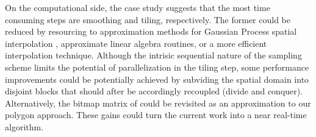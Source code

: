  On the computational side, the
case study suggests that the most time consuming steps are smoothing
and tiling, respectively. The former could be reduced by resourcing to
approximation methods for Gaussian Process spatial interpolation
\citep{Shi2007,Cressie2008,Katzfuss2011,Nguyen2012,Nguyen2014},
approximate linear algebra routines, or a more efficient interpolation
technique. Although the intrisic sequential nature of the sampling
scheme limits the potential of parallelization in the tiling step,
some performance improvements could be potentially achieved by
subviding the spatial domain into disjoint blocks that should after be
accordingly recoupled (divide and conquer). Alternatively, the bitmap
matrix of \cite{Han1997} could be revisited as an approximation to our
polygon approach. These gains could turn the current work into a near
real-time algorithm.


